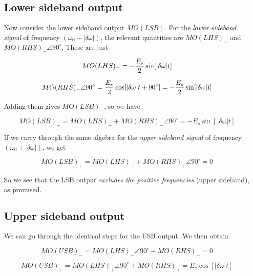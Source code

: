 \documentclass[11pt,preprint]{aastex}
\begin{document}
\subsection{Lower sideband output}

        Now consider the lower sideband output $MO(LSB)$. For the {\it
lower sideband signal} of frequency $(\omega_0 - |\delta \omega|)$, the
relevant quantities are $MO(LHS)_-$ and $MO(RHS)_- \angle 90^\circ$.
These are just

\begin{mathletters}
\begin{equation}
MO(LHS)_- =
-{E_s \over 2} \sin [|\delta \omega | t]
\end{equation}

\begin{equation}
MO(RHS)_- \angle 90^\circ =
{E_s \over 2} \cos [|\delta \omega | t + 90^\circ] =
   -{E_s \over 2} \sin [|\delta \omega | t]
\end{equation}
\end{mathletters}

\noindent Adding them gives $MO(LSB)_-$, so we have


\begin{mathletters}
\begin{equation}
MO(LSB)_- = MO(LHS)_- + MO(RHS)_- \angle 90^\circ =
   -E_s  \sin [|\delta \omega | t]
\end{equation}

\noindent If we carry through the same algebra for the {\it upper
sideband signal} of frequency $(\omega_0 + |\delta \omega|)$, we get

\begin{equation}
MO(LSB)_+ = MO(LHS)_+ + MO(RHS)_+ \angle 90^\circ = 0
\end{equation}
\end{mathletters}

\noindent So we see that the LSB output {\it excludes the positive
frequencies} (upper sideband), as promised.

\subsection{Upper sideband output}

        We can go through the identical steps for the USB output. We
then obtain

\begin{mathletters}
\begin{equation}
MO(USB)_- =  MO(LHS)_- \angle 90^\circ  + MO(RHS)_- = 0
\end{equation}

\begin{equation}
MO(USB)_+ = MO(LHS)_+   \angle 90^\circ + MO(RHS)_+ =
        E_s  \cos [|\delta \omega | t]
\end{equation}
\end{mathletters}
\end{document}
